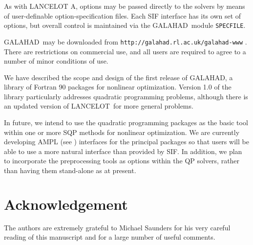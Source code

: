 \documentclass[twoside]{article}
\newcommand{\gal}{{\sf GALAHAD}}
\newcommand{\lan}{{\sf LANCELOT}}
\newcommand{\lana}{{\sf LANCELOT A}}
\begin{document}
As with \lana, options may be passed directly to the solvers by means of
user-definable option-specification files. Each SIF interface 
has its own set of options, but overall control is maintained via 
the \gal\ module {\tt SPECFILE}.

{}

\gal\ may be downloaded from
{\tt http://galahad.rl.ac.uk/galahad-www} .
There are restrictions on commercial use, and all users are required to
agree to a number of minor conditions of use.


We have described the scope and design of the first release of \gal,
a library of Fortran 90 packages for nonlinear optimization.
Version 1.0 of the library particularly addresses quadratic programming 
problems, although there is an updated version of \lan\ for more general 
problems. 

In future, we intend to use the quadratic programming packages as the
basic tool within one or more SQP methods for nonlinear optimization.
We are currently developing AMPL (see ) interfaces 
for the principal packages so that users will be able to use a more
natural interface than provided by SIF. In addition, we plan to incorporate
the preprocessing tools as options within the QP solvers, rather than having
them stand-alone as at present.

\section*{Acknowledgement}

The authors are extremely grateful to Michael Saunders for his very
careful reading of this manuscript and for a large number of useful comments.

\end{document}
